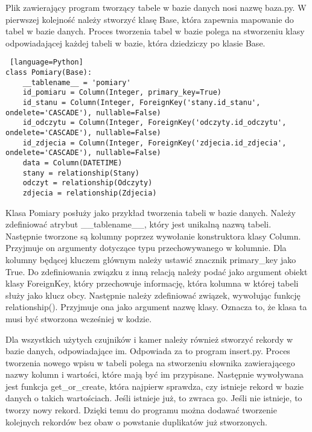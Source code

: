 \documentclass[a4paper,12pt,twoside]{article}
\begin{document}
Plik zawierający program tworzący tabele w bazie danych nosi nazwę baza.py. W pierwszej kolejność należy stworzyć klasę Base, która zapewnia mapowanie do tabel w bazie danych. Proces tworzenia tabel w bazie polega na stworzeniu klasy odpowiadającej każdej tabeli w bazie, która dziedziczy po klasie Base.
\begin{lstlisting} [language=Python]
class Pomiary(Base):
    __tablename__ = 'pomiary'
    id_pomiaru = Column(Integer, primary_key=True)
    id_stanu = Column(Integer, ForeignKey('stany.id_stanu', ondelete='CASCADE'), nullable=False)
    id_odczytu = Column(Integer, ForeignKey('odczyty.id_odczytu', ondelete='CASCADE'), nullable=False)
    id_zdjecia = Column(Integer, ForeignKey('zdjecia.id_zdjecia', ondelete='CASCADE'), nullable=False)
    data = Column(DATETIME)
    stany = relationship(Stany)
    odczyt = relationship(Odczyty)
    zdjecia = relationship(Zdjecia)
\end{lstlisting}
Klasa Pomiary posłuży jako przykład tworzenia tabeli w bazie danych. Należy zdefiniować atrybut {\_\_}tablename{\_\_}, który jest unikalną nazwą tabeli. Następnie tworzone są kolumny poprzez wywołanie konstruktora klasy Column. Przyjmuje on argumenty dotyczące typu przechowywanego w kolumnie. Dla kolumny będącej kluczem głównym należy ustawić znacznik primary{\_}key jako True. Do zdefiniowania związku z inną relacją należy podać jako argument obiekt klasy ForeignKey, który przechowuje informację, która kolumna w której tabeli służy jako klucz obcy. Następnie należy zdefiniować związek, wywołując funkcję relationship(). Przyjmuje ona jako argument nazwę klasy. Oznacza to, że klasa ta musi być stworzona wcześniej w kodzie.

Dla wszystkich użytych czujników i kamer należy również stworzyć rekordy w bazie danych, odpowiadające im. Odpowiada za to program insert.py. Proces tworzenia nowego wpisu w tabeli polega na stworzeniu słownika zawierającego nazwy kolumn i wartości, które mają być im przypisane. Następnie wywoływana jest funkcja get{\_}or{\_}create, która najpierw sprawdza, czy istnieje rekord w bazie danych o takich wartościach. Jeśli istnieje już, to zwraca go. Jeśli nie istnieje, to tworzy nowy rekord. Dzięki temu do programu można dodawać tworzenie kolejnych rekordów bez obaw o powstanie duplikatów już stworzonych.
\end{document}
